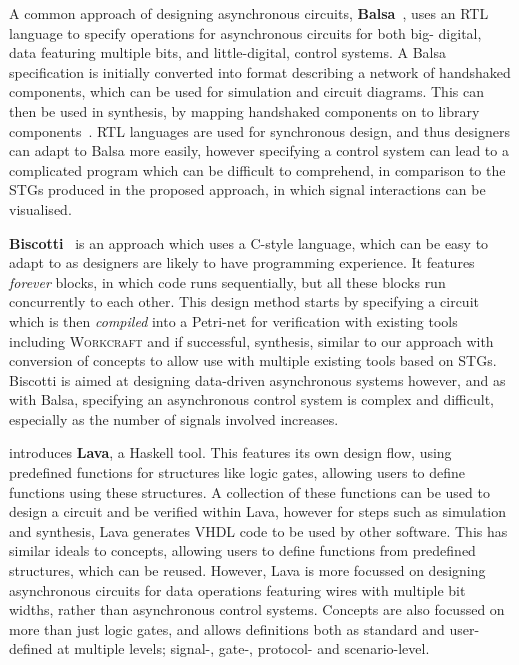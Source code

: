 \documentclass[british,compsoc]{IEEEtran}
\newcommand{\noun}[1]{\textsc{#1}}
\begin{document}
A common approach of designing asynchronous circuits, \textbf{Balsa}~\cite{edwards2002balsa}, uses an RTL language to specify operations for asynchronous circuits for both big-
digital, data featuring multiple bits, and little-digital, control systems. A Balsa specification is initially converted into format describing a network of handshaked components, which can be
used for simulation and circuit diagrams. This can then be used in synthesis, by mapping handshaked components on to library components~\cite{van1993handshake}. RTL languages
are used for synchronous design, and thus designers can adapt to Balsa more easily, however specifying a control system can lead to a complicated program which can be difficult to
comprehend, in comparison to the STGs produced in the proposed approach, in which signal interactions can be visualised.

\textbf{Biscotti}~\cite{5232351} is an approach which uses a C-style language, which can be easy to adapt to as designers are likely to have programming experience. It features
\emph{forever} blocks, in which code runs sequentially, but all these blocks run concurrently to each other. This design method starts by specifying a circuit which is then
\emph{compiled} into a Petri-net for verification with existing tools including \noun{Workcraft} and if successful, synthesis, similar to our approach with conversion of concepts to allow
use with multiple existing tools based on STGs. Biscotti is aimed at designing data-driven asynchronous systems however, and as with Balsa, specifying an asynchronous control system is
complex and difficult, especially as the number of signals involved increases.

\cite{bjesse1998lava} introduces \textbf{Lava}, a Haskell tool. This features its own design flow, using predefined functions for structures like logic gates, allowing users to define
functions using these structures. A collection of these functions can be used to design a circuit and be verified within Lava, however for steps such as simulation and synthesis, Lava
generates VHDL code to be used by other software. This has similar ideals to concepts, allowing users to define functions from predefined structures, which can be reused. However,
Lava is more focussed on designing asynchronous circuits for data operations featuring wires with multiple bit widths, rather than asynchronous control systems. Concepts are also
focussed on more than just logic gates, and allows definitions both as standard and user-defined at multiple levels; signal-, gate-, protocol- and scenario-level.
\end{document}
